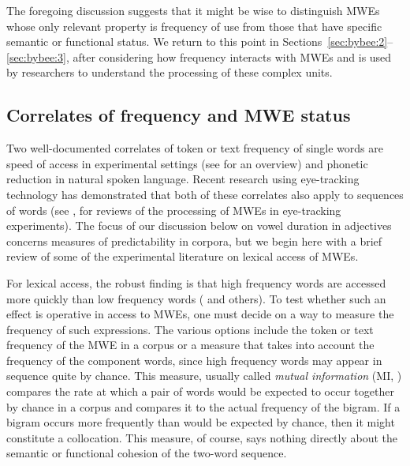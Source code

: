 \documentclass[output=paper]{langscibook}
\begin{document}
The foregoing discussion suggests that it might be wise to distinguish MWEs whose only relevant property is frequency of use from those that have specific semantic or functional status. We return to this point in Sections~\ref{sec:bybee:2}--\ref{sec:bybee:3}, after considering how frequency interacts with MWEs and is used by researchers to understand the processing of these complex units. 

\subsection{Correlates of frequency and MWE status}\label{sec:bybee:1.2}

Two well-documented correlates of token or text frequency of single words are speed of access in experimental settings (see \citealt{Ellis2002} for an overview) and phonetic reduction in natural spoken language. Recent research using eye-tracking technology has demonstrated that both of these correlates also apply to sequences of words (see \citealt{CarrolConklin2014, Vilkaitė2016}, for reviews of the processing of MWEs in eye-tracking experiments). The focus of our discussion below on vowel duration in adjectives concerns measures of predictability in corpora, but we begin here with a brief review of some of the experimental literature on lexical access of MWEs.

For lexical access, the robust finding is that high frequency words are accessed more quickly than low frequency words (\citealt{ScarboroughEtAl1977,GardnerEtAl1987} and others). To test whether such an effect is operative in access to MWEs, one must decide on a way to measure the frequency of such expressions. The various options include the token or text frequency of the MWE in a corpus or a measure that takes into account the frequency of the component words, since high frequency words may appear in sequence quite by chance. This measure, usually called \textit{mutual information} (MI, \citealt{ChurchHanks1990}) compares the rate at which a pair of words would be expected to occur together by chance in a corpus and compares it to the actual frequency of the bigram. If a bigram occurs more frequently than would be expected by chance, then it might constitute a collocation. This measure, of course, says nothing directly about the semantic or functional cohesion of the two-word sequence.  
\end{document}

